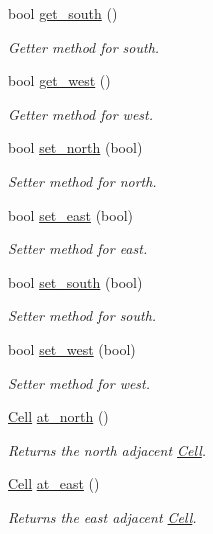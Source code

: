 \begin{DoxyCompactItemize}
bool \hyperlink{classmaze_1_1Cell_aa3d4aabbfb3434fa30dac654c34a78c1}{get\+\_\+south} ()
\begin{DoxyCompactList}\small\item\em Getter method for south. \end{DoxyCompactList}\item 
bool \hyperlink{classmaze_1_1Cell_a40b00cc592c00c60c6749289b8a6c9c9}{get\+\_\+west} ()
\begin{DoxyCompactList}\small\item\em Getter method for west. \end{DoxyCompactList}\item 
bool \hyperlink{classmaze_1_1Cell_a22debec3d758aa08384bdbd1e92cb632}{set\+\_\+north} (bool)
\begin{DoxyCompactList}\small\item\em Setter method for north. \end{DoxyCompactList}\item 
bool \hyperlink{classmaze_1_1Cell_a34f010ee5f165f0c253d6bed6c9a99da}{set\+\_\+east} (bool)
\begin{DoxyCompactList}\small\item\em Setter method for east. \end{DoxyCompactList}\item 
bool \hyperlink{classmaze_1_1Cell_ac42f810920a1c85ec3600ebcc16cdec9}{set\+\_\+south} (bool)
\begin{DoxyCompactList}\small\item\em Setter method for south. \end{DoxyCompactList}\item 
bool \hyperlink{classmaze_1_1Cell_a7b0d55a391d32b61abe0cc411a2c5efc}{set\+\_\+west} (bool)
\begin{DoxyCompactList}\small\item\em Setter method for west. \end{DoxyCompactList}\item 
\hyperlink{classmaze_1_1Cell}{Cell} \hyperlink{classmaze_1_1Cell_ac157da293a04b48cfb0503ecb7697e16}{at\+\_\+north} ()
\begin{DoxyCompactList}\small\item\em Returns the north adjacent \hyperlink{classmaze_1_1Cell}{Cell}. \end{DoxyCompactList}\item 
\hyperlink{classmaze_1_1Cell}{Cell} \hyperlink{classmaze_1_1Cell_a4445101be1c13235cc8fe3a6b247cce2}{at\+\_\+east} ()
\begin{DoxyCompactList}\small\item\em Returns the east adjacent \hyperlink{classmaze_1_1Cell}{Cell}. \end{DoxyCompactList}\item 

\end{DoxyCompactItemize}
